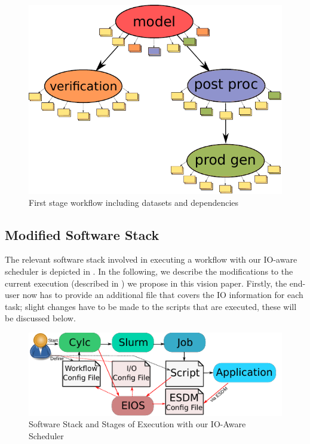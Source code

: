 \documentclass[a4paper]{article}
\begin{document}
\begin{figure}[H]
  \centering
  \includegraphics[width=0.6\columnwidth]{cycle-io-dep}
  \caption{First stage workflow including datasets and dependencies}
  \label{fig:cycle-io-dep}
\end{figure}


\subsection{Modified Software Stack}

The relevant software stack involved in executing a workflow with our IO-aware scheduler is depicted in .
In the following, we describe the modifications to the current execution (described in ) we propose in this vision paper.
Firstly, the end-user now has to provide an additional file that covers the IO information for each task; slight changes have to be made to the scripts that are executed, these will be discussed below.

\begin{figure}[tb]
  \centering
  \includegraphics[scale=1.4]{stages-io}
  \caption{Software Stack and Stages of Execution with our IO-Aware Scheduler}
  \label{fig:stages-io}
\end{figure}
\end{document}
